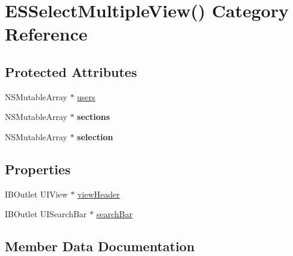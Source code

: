 \hypertarget{category_e_s_select_multiple_view_07_08}{}\section{E\+S\+Select\+Multiple\+View() Category Reference}
\label{category_e_s_select_multiple_view_07_08}
\subsection*{Protected Attributes}
\begin{DoxyCompactItemize}
\item 
N\+S\+Mutable\+Array $\ast$ \hyperlink{category_e_s_select_multiple_view_07_08_a264ae40deeb45efc1742b19947c70b9c}{users}
\item 
\hypertarget{category_e_s_select_multiple_view_07_08_aee8cd70b43bd362fc9faa80f3969957b}{}N\+S\+Mutable\+Array $\ast$ {\bfseries sections}\label{category_e_s_select_multiple_view_07_08_aee8cd70b43bd362fc9faa80f3969957b}

\item 
\hypertarget{category_e_s_select_multiple_view_07_08_a3ee3854cdb51f1004b69352f91036144}{}N\+S\+Mutable\+Array $\ast$ {\bfseries selection}\label{category_e_s_select_multiple_view_07_08_a3ee3854cdb51f1004b69352f91036144}

\end{DoxyCompactItemize}
\subsection*{Properties}
\begin{DoxyCompactItemize}
\item 
I\+B\+Outlet U\+I\+View $\ast$ \hyperlink{category_e_s_select_multiple_view_07_08_aac8d8f4b6bb2db74670ed6f1022c4408}{view\+Header}
\item 
I\+B\+Outlet U\+I\+Search\+Bar $\ast$ \hyperlink{category_e_s_select_multiple_view_07_08_a58e40c69a0d5b3ce93a13fea5c9c9caa}{search\+Bar}
\end{DoxyCompactItemize}


\subsection{Member Data Documentation}
\hypertarget{category_e_s_select_multiple_view_07_08_a264ae40deeb45efc1742b19947c70b9c}{}
